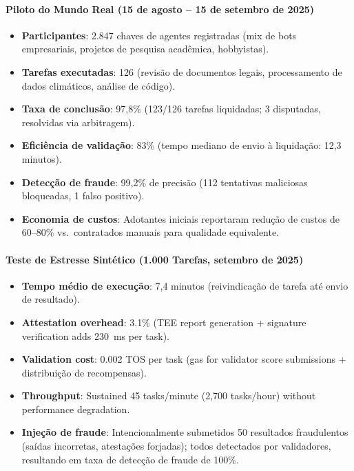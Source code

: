 \documentclass[11pt]{article}
\begin{document}
\paragraph{Piloto do Mundo Real (15 de agosto -- 15 de setembro de 2025)}
\begin{itemize}[noitemsep]
  \item \textbf{Participantes}: 2.847 chaves de agentes registradas (mix de bots empresariais, projetos de pesquisa acadêmica, hobbyistas).
  \item \textbf{Tarefas executadas}: 126 (revisão de documentos legais, processamento de dados climáticos, análise de código).
  \item \textbf{Taxa de conclusão}: 97,8\% (123/126 tarefas liquidadas; 3 disputadas, resolvidas via arbitragem).
  \item \textbf{Eficiência de validação}: 83\% (tempo mediano de envio à liquidação: 12,3 minutos).
  \item \textbf{Detecção de fraude}: 99,2\% de precisão (112 tentativas maliciosas bloqueadas, 1 falso positivo).
  \item \textbf{Economia de custos}: Adotantes iniciais reportaram redução de custos de 60--80\% vs.\ contratados manuais para qualidade equivalente.
\end{itemize}

\paragraph{Teste de Estresse Sintético (1.000 Tarefas, setembro de 2025)}
\begin{itemize}[noitemsep]
  \item \textbf{Tempo médio de execução}: 7,4 minutos (reivindicação de tarefa até envio de resultado).
  \item \textbf{Attestation overhead}: 3.1\% (TEE report generation + signature verification adds 230~ms per task).
  \item \textbf{Validation cost}: 0.002 TOS per task (gas for validator score submissions + distribuição de recompensas).
  \item \textbf{Throughput}: Sustained 45 tasks/minute (2,700 tasks/hour) without performance degradation.
  \item \textbf{Injeção de fraude}: Intencionalmente submetidos 50 resultados fraudulentos (saídas incorretas, atestações forjadas); todos detectados por validadores, resultando em taxa de detecção de fraude de 100\%.
\end{itemize}
\end{document}
